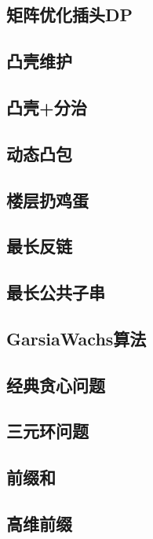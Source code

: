 \documentclass{article}
\begin{document}
\subsection{矩阵优化插头DP} 

\subsection{凸壳维护} 

\subsection{凸壳+分治} 

\subsection{动态凸包} 

\subsection{楼层扔鸡蛋} 

\subsection{最长反链} 

\subsection{最长公共子串} 

\subsection{GarsiaWachs算法} 

\subsection{经典贪心问题} 

\subsection{三元环问题} 

\subsection{前缀和} 

\subsection{高维前缀} 

\end{document}
